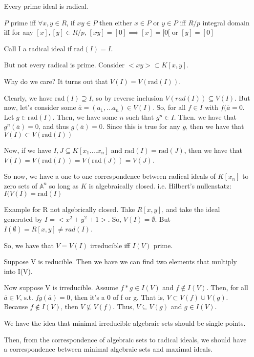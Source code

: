 \documentclass[10pt]{article}
\begin{document}
Every prime ideal is radical.

$P$ prime iff $\forall x,y \in R$, if $xy \in P$ then either $x\in P$ or $y \in P$ iff $R/p$ integral domain iff for any $[x],[y] \in R/p$, $[xy] = [0] \implies [x] = [0[$ or $[y] = [0]$

Call I a radical ideal if $\text{rad}(I) = I$.

But not every radical is prime. Consider $<xy> \subset K[x,y]$.

Why do we care? It turns out that $V(I) = V(\text{rad}(I))$.

Clearly, we have $\text{rad}(I) \supseteq I$, so by reverse inclusion $V(rad(I)) \subseteq V(I)$. But now, let’s consider some $\overline{a} = (a_1,...a_n) \in V(I)$. So, for all $f \in I$ with $f(\overline{a} = 0$. Let $g \in \text{rad}(I)$. Then, we have some $n$ such that $g^n \in I$. Then. we have that $g^n(\overline{a}) = 0$, and thus $g(\overline{a}) = 0$. Since this is true for any $g$, then we have that $V(I) \subset V(\text{rad}(I))$

Now, if we have $I, J \subseteq K[x_1....x_n]$ and $\text{rad}(I) = \text{rad}(J)$, then we have that $V(I) = V(\text{rad}(I)) = V(\text{rad}(J)) = V(J)$.

So now, we have a one to one correspondence between radical ideals of $K[x_n]$ to zero sets of $\mathbb{A}^n$ so long as $K$ is algebraically closed. i.e. Hilbert’s nullenstatz: $I(V(I) = \text{rad}(I)$

Example for R not algebrically closed. Take $R[x,y]$, and take the ideal generated by $I = <x^2 + y^2 + 1>$. So, $V(I) = \emptyset$. But $I(\emptyset) = R[x,y] \not = rad(I)$. 

So, we have that $V = V(I)$ irreducible iff $I(V)$ prime. 

Suppose V is reducible. Then we have we can find two elements that multiply into I(V).

Now suppose V is irreducible. Assume $f*g \in I(V)$ and $f \not \in I(V)$. Then, for all $\overline{a} \in V$, s.t. $fg(\overline{a}) = 0$, then it’s a 0 of f or g. That is, $V \subset V(f) \cup V(g)$. Because $f \not \in I(V)$, then $V \not\subseteq V(f)$. Thus, $V \subseteq V(g)$ and $g \in I(V).$

We have the idea that minimal irreducible algebraic sets should be single points. 

Then, from the correspondence of algebraic sets to radical ideals, we should have a correspondence between minimal algebraic sets and maximal ideals. 
\end{document}
